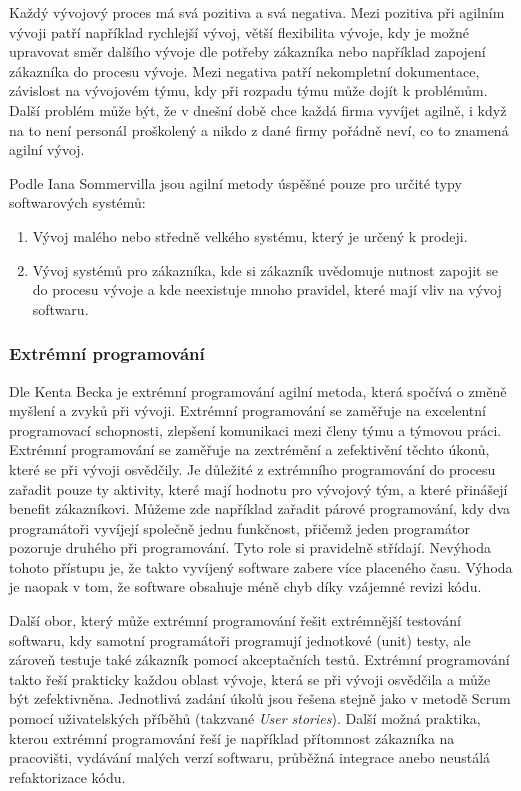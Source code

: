 \documentclass[czech,master,public,dept460,male,cpdeclaration,oneside]{diploma}
\begin{document}
Každý vývojový proces má svá pozitiva a svá negativa. Mezi pozitiva při agilním vývoji patří například rychlejší vývoj, větší flexibilita vývoje, kdy je možné upravovat směr dalšího vývoje dle potřeby zákazníka nebo například zapojení zákazníka do procesu vývoje. Mezi negativa patří nekompletní dokumentace, závislost na vývojovém týmu, kdy při rozpadu týmu může dojít k problémům. Další problém může být, že v dnešní době chce každá firma vyvíjet agilně, i když na to není personál proškolený a nikdo z dané firmy pořádně neví, co to znamená agilní vývoj.

Podle Iana Sommervilla \cite{ref:sommerrville_agile_products} jsou agilní metody úspěšné pouze pro určité typy softwarových systémů:

\begin{enumerate}
\item Vývoj malého nebo středně velkého systému, který je určený k prodeji.
\item Vývoj systémů pro zákazníka, kde si zákazník uvědomuje nutnost zapojit se do procesu vývoje a kde neexistuje mnoho pravidel, které mají vliv na vývoj softwaru.
\end{enumerate}


\subsubsection{Extrémní programování}
Dle Kenta Becka \cite{ref:what_is_xp} je extrémní programování agilní metoda, která spočívá o změně myšlení a zvyků při vývoji. Extrémní programování se zaměřuje na excelentní programovací schopnosti, zlepšení komunikaci mezi členy týmu a týmovou práci. Extrémní programování se zaměřuje na zextrémění a zefektivění těchto úkonů, které se při vývoji osvědčily. Je důležité z extrémního programování do procesu zařadit pouze ty aktivity, které mají hodnotu pro vývojový tým, a které přinášejí benefit zákazníkovi. Můžeme zde například zařadit párové programování, kdy dva programátoři vyvíjejí společně jednu funkčnost, přičemž jeden programátor pozoruje druhého při programování. Tyto role si pravidelně střídají. Nevýhoda tohoto přístupu je, že takto vyvíjený software zabere více placeného času. Výhoda je naopak v tom, že software obsahuje méně chyb díky vzájemné revizi kódu.

Další obor, který může extrémní programování řešit extrémnější testování softwaru, kdy samotní programátoři programují jednotkové (unit) testy, ale zároveň testuje také zákazník pomocí akceptačních testů. Extrémní programování takto řeší prakticky každou oblast vývoje, která se při vývoji osvědčila a může být zefektivněna. Jednotlivá zadání úkolů jsou řešena stejně jako v metodě Scrum pomocí uživatelských příběhů (takzvané \textit{User stories}). Další možná praktika, kterou extrémní programování řeší je například přítomnost zákazníka na pracovišti, vydávání malých verzí softwaru, průběžná integrace anebo neustálá refaktorizace kódu.
\end{document}
